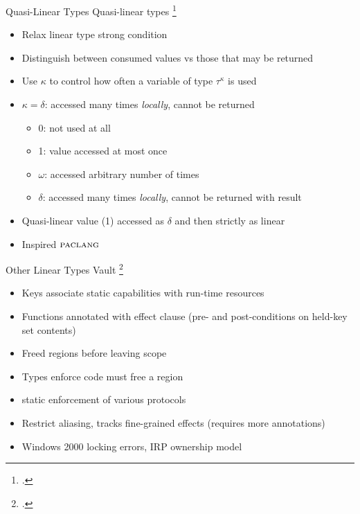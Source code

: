 \begin{frame}{Quasi-Linear Types}
\footnotesize
  Quasi-linear types \footcite{kobayashi_quasi-linear_1999} %
    \begin{itemize}
        \item Relax linear type strong condition
        \item Distinguish between consumed values vs those that may be returned
        \item Use $\kappa$ to control how often a variable of type $\tau^{\kappa}$ is used
        \item $\kappa = \delta$: accessed many times \emph{locally}, cannot be returned
            \begin{itemize}
                \item 0: not used at all
                \item 1: value accessed at most once
                \item $\omega$: accessed arbitrary number of times
                \item $\delta$: accessed many times \emph{locally}, cannot be returned with result
            \end{itemize}
        \item Quasi-linear value (1) accessed as $\delta$ and then strictly as linear
        \item Inspired $\textsc{paclang}$
    \end{itemize}
\end{frame}

\begin{frame}{Other Linear Types}
\footnotesize
  Vault \footcite{deline_enforcing_2001}
    \vspace{-0.09in}
    \begin{itemize}
        \item Keys associate static capabilities with run-time resources %
        \item Functions annotated with effect clause (pre- and post-conditions on held-key set contents)
        \item Freed regions before leaving scope
        \item Types enforce code must free a region
        \item static enforcement of various protocols
        \item Restrict aliasing, tracks fine-grained effects (requires more annotations)
        \item Windows 2000 locking errors, IRP ownership model %
    \end{itemize}
\end{frame}

